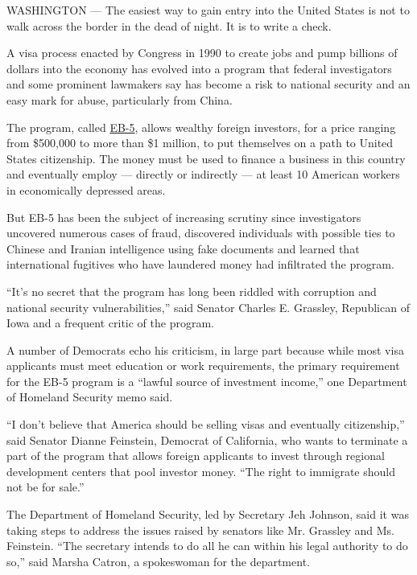 WASHINGTON --- The easiest way to gain entry into the United States is
not to walk across the border in the dead of night. It is to write a
check.

A visa process enacted by Congress in 1990 to create jobs and pump
billions of dollars into the economy has evolved into a program that
federal investigators and some prominent lawmakers say has become a risk
to national security and an easy mark for abuse, particularly from
China.

The program, called
\href{http://www.nytimes.com/2015/05/17/realestate/want-a-green-card-invest-in-real-estate.html}{EB-5},
allows wealthy foreign investors, for a price ranging from \$500,000 to
more than \$1 million, to put themselves on a path to United States
citizenship. The money must be used to finance a business in this
country and eventually employ --- directly or indirectly --- at least 10
American workers in economically depressed areas.

But EB-5 has been the subject of increasing scrutiny since investigators
uncovered numerous cases of fraud, discovered individuals with possible
ties to Chinese and Iranian intelligence using fake documents and
learned that international fugitives who have laundered money had
infiltrated the program.

``It's no secret that the program has long been riddled with corruption
and national security vulnerabilities,'' said Senator Charles E.
Grassley, Republican of Iowa and a frequent critic of the program.

A number of Democrats echo his criticism, in large part because while
most visa applicants must meet education or work requirements, the
primary requirement for the EB-5 program is a ``lawful source of
investment income,'' one Department of Homeland Security memo said.

``I don't believe that America should be selling visas and eventually
citizenship,'' said Senator Dianne Feinstein, Democrat of California,
who wants to terminate a part of the program that allows foreign
applicants to invest through regional development centers that pool
investor money. ``The right to immigrate should not be for sale.''

The Department of Homeland Security, led by Secretary Jeh Johnson, said
it was taking steps to address the issues raised by senators like Mr.
Grassley and Ms. Feinstein. ``The secretary intends to do all he can
within his legal authority to do so,'' said Marsha Catron, a spokeswoman
for the department.

